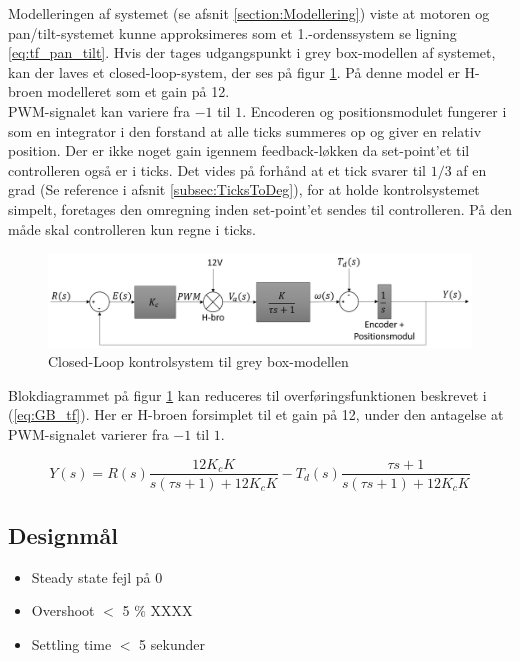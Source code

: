 Modelleringen af systemet (se afsnit \ref{section:Modellering}) viste at motoren og pan/tilt-systemet kunne approksimeres som et 1.-ordenssystem se ligning \eqref{eq:tf_pan_tilt}.
Hvis der tages udgangspunkt i grey box-modellen af systemet, kan der laves et closed-loop-system, der ses på figur \ref{fig:GB_Model}. På denne model er H-broen modelleret som et gain på 12.\\ PWM-signalet kan variere fra $-1$ til $1$. Encoderen og positionsmodulet fungerer i som en integrator i den forstand at alle ticks summeres op og giver en relativ position. Der er ikke noget gain igennem feedback-løkken da set-point'et til controlleren også er i ticks. Det vides på forhånd at et tick svarer til $1/3$ af en grad (Se reference i afsnit \ref{subsec:TicksToDeg}), for at holde kontrolsystemet simpelt, foretages den omregning inden set-point'et sendes til controlleren. På den måde skal controlleren kun regne i ticks.

\begin{figure}[ht]
	\begin{center}
		\includegraphics[scale=0.5]{Billeder/Control_Loop.PNG}
	\end{center}
\caption{Closed-Loop kontrolsystem til grey box-modellen}
\label{fig:GB_Model}
\end{figure}

Blokdiagrammet på figur \ref{fig:GB_Model} kan reduceres til overføringsfunktionen beskrevet i (\ref{eq:GB_tf}). Her er H-broen forsimplet til et gain på 12, under den antagelse at PWM-signalet varierer fra $-1$ til $1$.

\begin{equation}\label{eq:GB_tf}
Y(s)=R(s)\frac{12K_{c}K}{s(\tau s+1)+12K_{c}K}-T_{d}(s)\frac{\tau s+1}{s(\tau s+1)+12K_{c}K}
\end{equation}

\subsection{Designmål}

\begin{itemize}[noitemsep]

\item Steady state fejl på 0
\item Overshoot $<$ 5 $\%$ XXXX
\item Settling time $<$ 5 sekunder 

\end{itemize}

